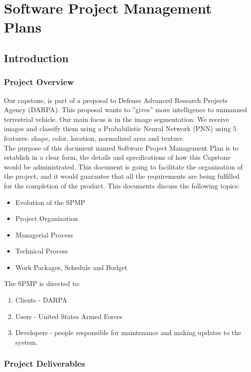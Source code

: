 \chapter{Software Project Management Plans}


\section{Introduction}
 
\subsection{Project Overview}
 Our capstone, is part of a proposal to Defense Advanced Research Projects Agency (DARPA). This proposal wants to ''gives'' more intelligence to unmanned terrestrial vehicle. Our main focus is in the image segmentation. We receive images and classify them using a Probabilistic Neural Network (PNN) using 5 features: shape, color, location, normalized area and texture.\\
    
 The purpose of this document named Software Project Management Plan is to establish in a clear form, the details and specifications of how this Capstone would be administrated. This document is going to facilitate the organization of the project, and it would guarantee that all the requirements are being fulfilled for the completion of the product.  This documents discuss the following topics:
\begin{itemize}
  \item Evolution of the SPMP
  \item Project Organization
  \item Managerial Process
  \item Technical Process
  \item Work Packages, Schedule and Budget
\end{itemize}

The SPMP is directed to:

\begin{enumerate}
  \item Clients - DARPA
  \item Users - United States Armed Forces
  \item Developers - people responsible for maintenance and making updates to the system.
\end{enumerate}

\subsection{Project Deliverables}

